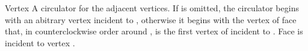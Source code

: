 \begin{ccRefClass}{Vertex}
{A circulator for the adjacent vertices.
If  is omitted, the circulator begins with
 an abitrary vertex incident
to , otherwise it begins with the
vertex of face  that, 
in counterclockwise order around ,
is the first vertex of  incident to .
\ccPrecond Face  is incident to vertex .}


\ccSeeAlso
{} \\
 \\
 \\
 \\




\end{ccRefClass}


